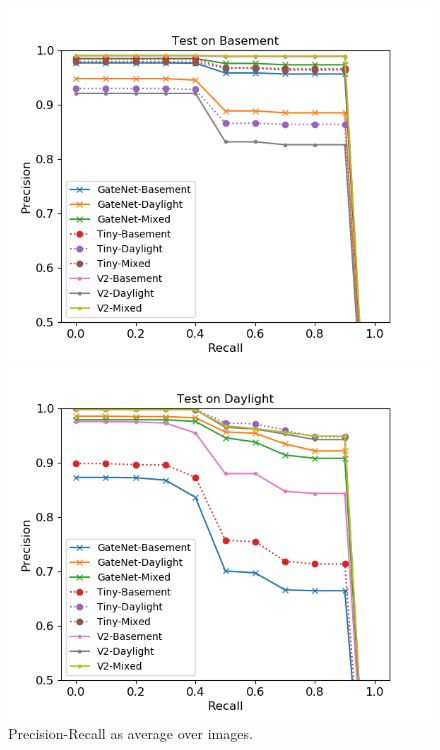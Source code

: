 \documentclass{article}
\begin{document}
\begin{figure}
	\centering
	\begin{minipage}{0.45\linewidth}
		\includegraphics[width=\linewidth]{fig/pr_basement_all}
	\end{minipage}
	\begin{minipage}{0.45\linewidth}
		\includegraphics[width=\linewidth]{fig/pr_daylight_all}
	\end{minipage}
\caption{Precision-Recall as average over images.}
\label{fig:results}
\end{figure}
\end{document}
